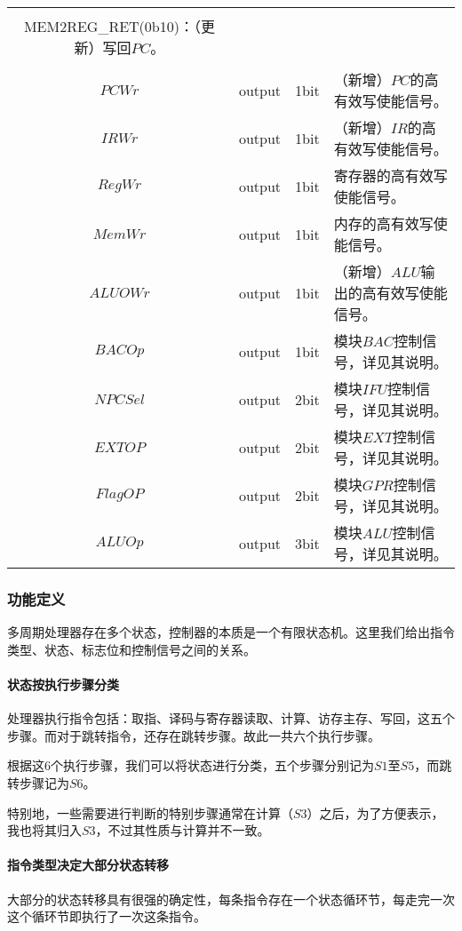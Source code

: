 \documentclass[main.tex]{subfiles}
\begin{document}
\begin{center}
\begin{longtable}[]{c c c l}
{             MEM2REG\_RAM(0b01)：写回$dm\_1k$中读出值。\\
             MEM2REG\_RET(0b10)：（更新）写回$PC$。\\
        } \\
        \midrule
        $PCWr$ & output & 1bit & （新增）$PC$的高有效写使能信号。\\
        $IRWr$ & output & 1bit & （新增）$IR$的高有效写使能信号。\\
        $RegWr$ & output & 1bit & 寄存器的高有效写使能信号。\\
        $MemWr$ & output & 1bit & 内存的高有效写使能信号。\\
        $ALUOWr$ & output & 1bit & （新增）$ALU$输出的高有效写使能信号。\\
        \midrule
        $BACOp$ & output & 1bit & 模块$BAC$控制信号，详见其说明。\\
        $NPCSel$ & output & 2bit & 模块$IFU$控制信号，详见其说明。\\
        $EXTOP$ & output & 2bit & 模块$EXT$控制信号，详见其说明。\\
        $FlagOP$ & output & 2bit & 模块$GPR$控制信号，详见其说明。\\
        $ALUOp$ & output & 3bit & 模块$ALU$控制信号，详见其说明。\\
        \bottomrule
    \end{longtable}
\end{center}

\subsubsection{功能定义}

多周期处理器存在多个状态，控制器的本质是一个有限状态机。这里我们给出指令类型、状态、标志位和控制信号之间的关系。

\paragraph{状态按执行步骤分类}
处理器执行指令包括：取指、译码与寄存器读取、计算、访存主存、写回，这五个步骤。而对于跳转指令，还存在跳转步骤。故此一共六个执行步骤。

根据这6个执行步骤，我们可以将状态进行分类，五个步骤分别记为$S1$至$S5$，而跳转步骤记为$S6$。

特别地，一些需要进行判断的特别步骤通常在计算（$S3$）之后，为了方便表示，我也将其归入$S3$，不过其性质与计算并不一致。

\paragraph{指令类型决定大部分状态转移}
大部分的状态转移具有很强的确定性，每条指令存在一个状态循环节，每走完一次这个循环节即执行了一次这条指令。
\end{document}
